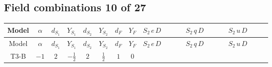 \documentclass[8pt]{article}
\begin{document}
\begin{landscape}
\subsection*{Field combinations 10 of 27}
\begin{longtable}{@{}cccccccc >{\raggedright\arraybackslash}p{0.21\linewidth} >{\raggedright\arraybackslash}p{0.21\linewidth} >{\raggedright\arraybackslash}p{0.21\linewidth}@{}}
\toprule
Model & $\alpha$ & $d_{S_1}$ & $Y_{S_1}$ & $d_{S_2}$ & $Y_{S_2}$ & $d_F$ & $Y_F$ & $S_2\,e\,D$ & $S_2\,q\,D$ & $S_2\,u\,D$ \\
\midrule
\endfirsthead
\toprule
Model & $\alpha$ & $d_{S_1}$ & $Y_{S_1}$ & $d_{S_2}$ & $Y_{S_2}$ & $d_F$ & $Y_F$ & $S_2\,e\,D$ & $S_2\,q\,D$ & $S_2\,u\,D$ \\
\midrule
\endhead
T3-B & $-1$ & $2$ & $-\frac{1}{2}$ & $2$ & $\frac{1}{2}$ & $1$ & $0$ & \scriptsize\adjustbox{max width=\linewidth}{$\begin{gathered} -\frac{i \hbar  \overline{e_{i_2}}\, \gamma ^{\mu _1}\, P_R\, e_{i_2} g_1^4 S_{2,j_1} D_{\mu _1}\left(S_{2,j_1}\right){}^{\dagger }}{120 m_1^2} \\ +\frac{i \hbar  \overline{e_{i_2}}\, \gamma ^{\mu _1}\, P_R\, e_{i_2} g_1^4 S_{2,j_1}{}^{\dagger } D_{\mu _1}\left(S_{2,j_1}\right)}{120 m_1^2}\end{gathered}$} & \scriptsize\adjustbox{max width=\linewidth}{$\begin{gathered} -\frac{i \hbar  \overline{q_{\alpha _1,a_1,i_2}}\, \gamma ^{\mu _1}\, P_L\, q_{\alpha _1,a_1,i_2} S_{2,j_1} D_{\mu _1}\left(S_{2,j_1}\right){}^{\dagger } g_2^4}{240 m_1^2} \\ +\frac{i \hbar  \overline{q_{\alpha _1,a_1,i_2}}\, \gamma ^{\mu _1}\, P_L\, q_{\alpha _1,a_2,i_2} S_{2,j_2} \mathcal{I}_{y_1,a_1,j_2} {\mathcal{C}_{LS_1F}}^{*}_{a_2,j_1} D_{\mu _1}\left(S_{2,j_1}\right){}^{\dagger } g_2^4}{120 m_1^2} \\ +\frac{i \hbar  \overline{q_{\alpha _1,a_1,i_2}}\, \gamma ^{\mu _1}\, P_L\, q_{\alpha _1,a_1,i_2} S_{2,j_1}{}^{\dagger } D_{\mu _1}\left(S_{2,j_1}\right) g_2^4}{240 m_1^2}\end{gathered}$} & \scriptsize\adjustbox{max width=\linewidth}{$\begin{gathered} +\frac{i \hbar  \overline{u_{\alpha _1,i_2}}\, \gamma ^{\mu _1}\, P_R\, u_{\alpha _1,i_2} g_1^4 S_{2,j_1} D_{\mu _1}\left(S_{2,j_1}\right){}^{\dagger }}{180 m_1^2} \\ -\frac{i \hbar  \overline{u_{\alpha _1,i_2}}\, \gamma ^{\mu _1}\, P_R\, u_{\alpha _1,i_2} g_1^4 S_{2,j_1}{}^{\dagger } D_{\mu _1}\left(S_{2,j_1}\right)}{180 m_1^2}\end{gathered}$} \\

\end{longtable}
\end{landscape}
\end{document}
